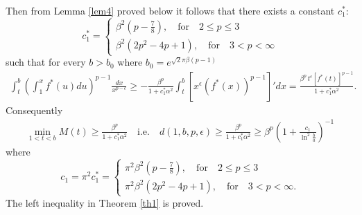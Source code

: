 \documentclass{amsart}
\theoremstyle{definition}
\theoremstyle{remark}
\numberwithin{equation}{section}
\begin{document}
Then  from Lemma \ref{lem4} proved below 
 it follows that  there exists a constant $c_1^*$:%
  \begin{equation*}
  c_1^*= 
    \begin{cases}
           \beta^2\left(p-\frac{7}{8}\right), \quad\mbox{for}\quad 2\le p\le3\\
         \beta^2 \left(2p^2-4p+1\right), \quad\mbox{for}\quad 3<p< \infty
        \end{cases}
 \end{equation*}
  such that for every $b>b_0$ where  $ b_0=e^{\sqrt2 \pi  \beta (p-1)}$
 \begin{align*}
\int_t^b\left(\int_1^x\! f^*(u)du \right)^{p-1}\!\!\!\frac{dx}{x^{p-\epsilon}}
\geq- \frac{\beta^p } {1+c_1^*\alpha^2}\int_t^b\!\left[x^\epsilon(f^*(x))^{p-1} \right]'dx
=\frac{\beta^p\, t^\epsilon[ f^*(t)]^{p-1}} {1+c_1^*\alpha^2}.
\end{align*}
Consequently 
\begin{align*}
\min_{1< t< b}M(t)\geq \frac{\beta^p} {1+c_1^*\alpha^2}\quad\mbox{i.e.}\quad
d(1,b,p,\epsilon)
\geq  \frac{\beta^p} {1+c_1^*\alpha^2}\geq  \beta^p\left(1+\frac{c_1}{\ln^2 \frac{b}{a}}\right)^{-1}
\end{align*}
where 
\begin{equation*}
  c_1=\pi^2c_1^*= 
    \begin{cases}
          \pi^2  \beta^2\left(p-\frac{7}{8}\right), \quad\mbox{for}\quad 2\le p\le3\\
        \pi^2 \beta^2 \left(2p^2-4p+1\right), \quad\mbox{for}\quad 3<p< \infty.
        \end{cases}
 \end{equation*}
 The left inequality in Theorem \ref{th1} is proved.
\end{document}
